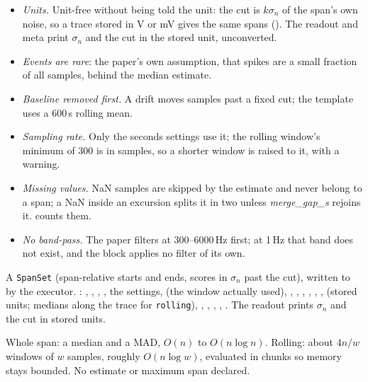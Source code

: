 \begin{itemize}
\item \emph{Units.} Unit-free without being told the unit: the cut is $k\sigma_n$ of the
  span's own noise, so a trace stored in V or mV gives the same spans
  (). The readout and meta print $\sigma_n$
  and the cut in the stored unit, unconverted.
\item \emph{Events are rare}: the paper's own assumption, that spikes are a small fraction of
  all samples, behind the median estimate.
\item \emph{Baseline removed first.} A drift moves samples past a fixed cut; the template uses
  a 600\,s rolling mean.
\item \emph{Sampling rate.} Only the seconds settings use it; the rolling window's minimum of
  300 is in samples, so a shorter window is raised to it, with a warning.
\item \emph{Missing values.} NaN samples are skipped by the estimate and never belong to a span;
  a NaN inside an excursion splits it in two unless \emph{merge\_gap\_s} rejoins it.
   counts them.
\item \emph{No band-pass.} The paper filters at 300--6000\,Hz first; at 1\,Hz that band does
  not exist, and the block applies no filter of its own.
\end{itemize}

A \texttt{SpanSet} (span-relative starts and ends, scores in $\sigma_n$ past the cut), written
to  by the executor. : , ,
, , the settings,  (the window actually
used), , , , , ,
,  (stored units; medians along the trace for \texttt{rolling}),
, , , ,
. The readout prints $\sigma_n$ and the cut in stored units.

Whole span: a median and a MAD, $O(n)$ to $O(n\log n)$. Rolling: about $4n/w$ windows of $w$
samples, roughly $O(n\log w)$, evaluated in chunks so memory stays bounded. No estimate or
maximum span declared.

